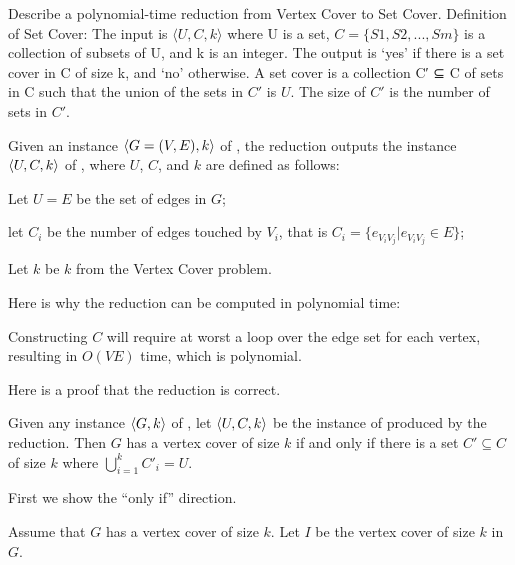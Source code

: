 \documentclass[11pt]{article}
\begin{document}
\begin{problems}


  \problem %

    Describe a polynomial-time reduction from Vertex Cover to Set Cover.
  Definition of Set Cover: The input is $⟨U,C,k⟩$ where U is a set, $C = \{S1,S2,...,Sm\}$ is a collection of subsets of U, and k is an integer. The output is ‘yes’ if there is a set cover in C of size k, and ‘no’ otherwise. A set cover is a collection C′ ⊆ C of sets in C such that the union of the sets in $C′$ is $U$. The size of $C′$ is the number of sets in $C′$.

  Given an instance $\langle G=(V,E),k \rangle$ of ,
  the reduction outputs the instance $\langle U,C,k \rangle$ of ,
  where $U$, $C$, and $k$ are defined as follows:

  \lineacross 

  Let $U = E$ be the set of edges in $G$;

  let $C_i$ be the number of edges touched by $V_i$, that is $C_i = \{e_{V_iV_j} | e_{V_iV_j} \in E\}$;
  
  Let $k$ be $k$ from the Vertex Cover problem.
  
  \lineacross 

  \medskip 
  Here is why the reduction can be computed in polynomial time:
  
  \lineacross 

  Constructing $C$ will require at worst a loop over the edge set for each vertex, resulting in $O(VE)$ time, which is polynomial.

  \lineacross 
  
  \medskip 
  Here is a proof that the reduction is correct.
  \begin{lemma}
    Given any instance $\langle G,k \rangle$ of ,
    let $\langle U,C,k \rangle$ be the instance of  produced by the reduction.
    Then $G$ has a vertex cover of size $k$
    if and only if there is a set $C' \subseteq C$ of size $k$ where $\bigcup\limits_{i=1}^{k} C'_i = U$.
  \end{lemma}
  \begin{longFormProof}
    \step First we show the ``only if'' direction.
    \begin{block}[1oi]
      {Assume that $G$ has a vertex cover of size $k$.}
      \step Let $I$ be the vertex cover of size $k$ in $G$.
      \smallskip 


\end{block}
\end{longFormProof}
\end{problems}
\end{document}
